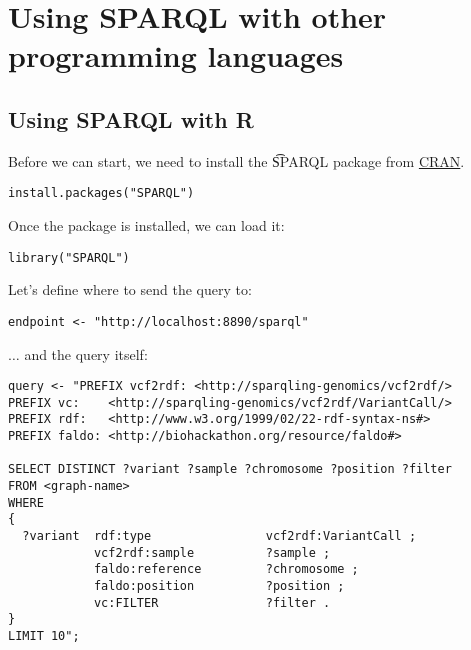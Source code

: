 \chapter{Using SPARQL with other programming languages}
\label{chap:programming}

\section{Using SPARQL with R}
\label{sec:sparql-with-r}

  Before we can start, we need to install the \t{SPARQL} package from
  \href{https://cran.r-project.org/web/packages/SPARQL/index.html}{CRAN}.

\begin{siderules}
\begin{verbatim}
install.packages("SPARQL")
\end{verbatim}
\end{siderules}

  Once the package is installed, we can load it:

\begin{siderules}
\begin{verbatim}
library("SPARQL")
\end{verbatim}
\end{siderules}

  Let's define where to send the query to:
\begin{siderules}
\begin{verbatim}
endpoint <- "http://localhost:8890/sparql"
\end{verbatim}
\end{siderules}

  $\ldots{}$ and the query itself:
\begin{siderules}
\begin{verbatim}
query <- "PREFIX vcf2rdf: <http://sparqling-genomics/vcf2rdf/>
PREFIX vc:    <http://sparqling-genomics/vcf2rdf/VariantCall/>
PREFIX rdf:   <http://www.w3.org/1999/02/22-rdf-syntax-ns#>
PREFIX faldo: <http://biohackathon.org/resource/faldo#>

SELECT DISTINCT ?variant ?sample ?chromosome ?position ?filter
FROM <graph-name>
WHERE
{
  ?variant  rdf:type                vcf2rdf:VariantCall ;
            vcf2rdf:sample          ?sample ;
            faldo:reference         ?chromosome ;
            faldo:position          ?position ;
            vc:FILTER               ?filter .
}
LIMIT 10";
\end{verbatim}
\end{siderules}

